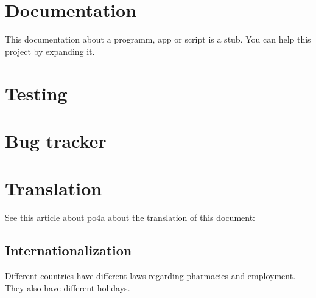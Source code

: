 \section{Documentation}
This documentation about a programm, app or script is a stub. You can help this project by expanding it.

\section{Testing}

\section{Bug tracker}

\section{Translation}
See this article about po4a about the translation of this document:
\href{https://maltris.org/mehrsprachigkeit-fur-fast-alles-po4a-7317.html}{}

\subsection{Internationalization}
Different countries have different laws regarding pharmacies and employment. They also have different holidays.
